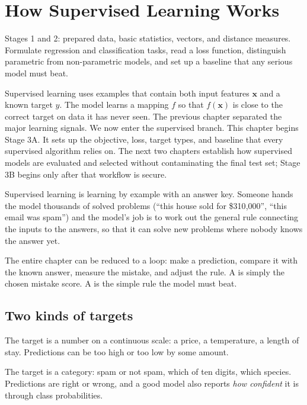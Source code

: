 \chapter{How Supervised Learning Works}
\label{ch:supervised}

\chapterguide%
  {Stages 1 and 2: prepared data, basic statistics, vectors, and distance measures.}
  {Formulate regression and classification tasks, read a loss function, distinguish parametric from non-parametric models, and set up a baseline that any serious model must beat.}

Supervised learning uses examples that contain both input features $\bm{x}$ and a known target $y$. The model learns a mapping $f$ so that $f(\bm{x})$ is close to the correct target on data it has never seen. The previous chapter separated the major learning signals. We now enter the supervised branch. This chapter begins Stage 3A. It sets up the objective, loss, target types, and baseline that every supervised algorithm relies on. The next two chapters establish how supervised models are evaluated and selected without contaminating the final test set; Stage 3B begins only after that workflow is secure.

\begin{intuition}
Supervised learning is learning by example with an answer key. Someone hands the model thousands of solved problems (``this house sold for \$310{,}000'', ``this email was spam'') and the model's job is to work out the general rule connecting the inputs to the answers, so that it can solve new problems where nobody knows the answer yet.
\end{intuition}

\begin{firstread}
The entire chapter can be reduced to a loop: make a prediction, compare it with the known answer, measure the mistake, and adjust the rule. A  is simply the chosen mistake score. A  is the simple rule the model must beat.
\end{firstread}

\section{Two kinds of targets}

\begin{description}[leftmargin=1.25in,style=nextline]
  \item[Regression] The target is a number on a continuous scale: a price, a temperature, a length of stay. Predictions can be too high or too low by some amount.
  \item[Classification] The target is a category: spam or not spam, which of ten digits, which species. Predictions are right or wrong, and a good model also reports \emph{how confident} it is through class probabilities.
\end{description}

